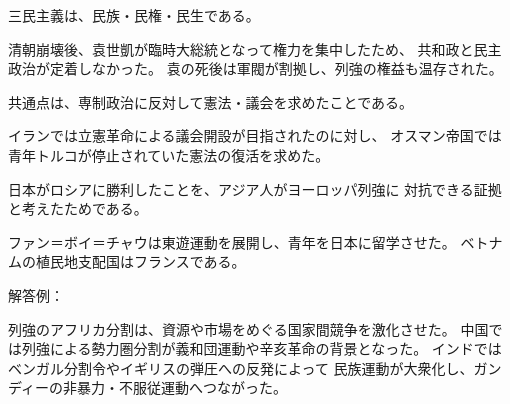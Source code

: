 \documentclass[a4paper,11pt]{ltjsarticle}
\begin{document}
\begin{description}[
  style=nextline,
  leftmargin=0pt,
  labelindent=0pt
]
三民主義は、民族・民権・民生である。

清朝崩壊後、袁世凱が臨時大総統となって権力を集中したため、
共和政と民主政治が定着しなかった。
袁の死後は軍閥が割拠し、列強の権益も温存された。

\item[第8問]

共通点は、専制政治に反対して憲法・議会を求めたことである。

イランでは立憲革命による議会開設が目指されたのに対し、
オスマン帝国では青年トルコが停止されていた憲法の復活を求めた。

\item[第9問]

日本がロシアに勝利したことを、アジア人がヨーロッパ列強に
対抗できる証拠と考えたためである。

ファン＝ボイ＝チャウは東遊運動を展開し、青年を日本に留学させた。
ベトナムの植民地支配国はフランスである。

\item[第10問]

解答例：

列強のアフリカ分割は、資源や市場をめぐる国家間競争を激化させた。
中国では列強による勢力圏分割が義和団運動や辛亥革命の背景となった。
インドではベンガル分割令やイギリスの弾圧への反発によって
民族運動が大衆化し、ガンディーの非暴力・不服従運動へつながった。

\end{description}
\end{document}
